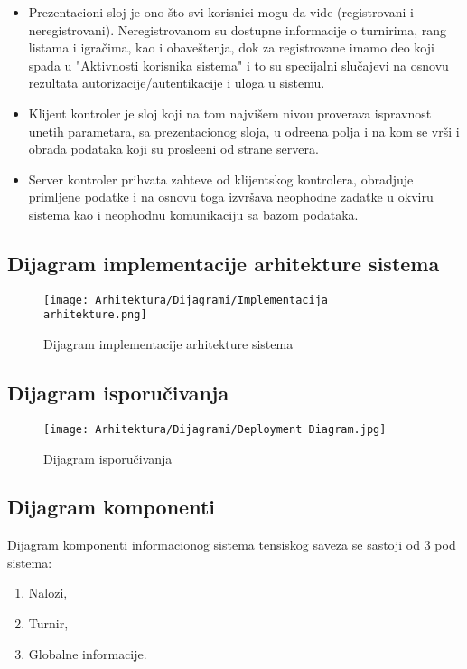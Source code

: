 \documentclass{article}
\begin{document}
\begin{itemize}
    \item Prezentacioni sloj je ono što svi korisnici mogu da vide (registrovani i neregistrovani). Neregistrovanom su dostupne informacije o turnirima, rang listama i igračima, kao i obaveštenja, dok za registrovane imamo deo koji spada u "Aktivnosti korisnika sistema" i to su specijalni slučajevi na osnovu rezultata autorizacije/autentikacije i uloga u sistemu.
    \item Klijent kontroler je sloj koji na tom najvišem nivou proverava ispravnost unetih parametara, sa prezentacionog sloja, u odre\dj ena polja i na kom se vrši i obrada podataka koji su prosle\dj eni od strane servera. 
    \item Server kontroler prihvata zahteve od klijentskog kontrolera, obradjuje primljene podatke i na osnovu toga izvršava neophodne zadatke u okviru sistema kao i neophodnu komunikaciju sa bazom podataka.
\end{itemize}


\newpage
\subsection{Dijagram implementacije arhitekture sistema}
\begin{figure}[!ht]
        \begin{center}
            \texttt{[image: Arhitektura/Dijagrami/Implementacija arhitekture.png]}
        \end{center}
    \caption{Dijagram implementacije arhitekture sistema}
    \end{figure}
    
\newpage
\subsection{Dijagram isporučivanja}
\begin{figure}[!ht]
        \begin{center}
            \texttt{[image: Arhitektura/Dijagrami/Deployment Diagram.jpg]}
        \end{center}
    \caption{Dijagram isporučivanja}
    \end{figure}
    
\newpage
\subsection{Dijagram komponenti}
Dijagram komponenti informacionog sistema tensiskog saveza se sastoji od 3 pod sistema:
\begin{enumerate}
    \item Nalozi,
    \item Turnir,
    \item Globalne informacije.
\end{enumerate}
\end{document}
